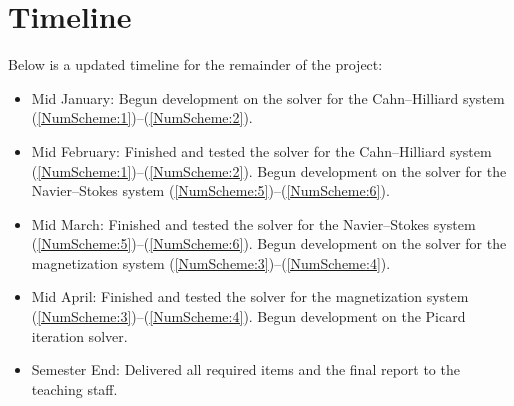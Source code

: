 \documentclass[11pt,fullpage]{article}
\theoremstyle{lemma}
\theoremstyle{definition}
\theoremstyle{lemma}
\begin{document}
\section{Timeline}
Below is a updated timeline for the remainder of the project:
\begin{itemize}
	\item Mid January: Begun development on the solver for the Cahn--Hilliard system (\ref{NumScheme:1})--(\ref{NumScheme:2}).
	
	\item Mid February: Finished and tested the solver for the Cahn--Hilliard system (\ref{NumScheme:1})--(\ref{NumScheme:2}). Begun development on the solver for the Navier--Stokes system (\ref{NumScheme:5})--(\ref{NumScheme:6}).
	
	\item Mid March: Finished and tested the solver for the Navier--Stokes system (\ref{NumScheme:5})--(\ref{NumScheme:6}). Begun development on the solver for the magnetization system (\ref{NumScheme:3})--(\ref{NumScheme:4}). 
	
	\item Mid April: Finished and tested the solver for the magnetization system (\ref{NumScheme:3})--(\ref{NumScheme:4}). Begun development on the Picard iteration solver.
	
	\item Semester End: Delivered all required items and the final report to the teaching staff.
\end{itemize}


	


\end{document}
